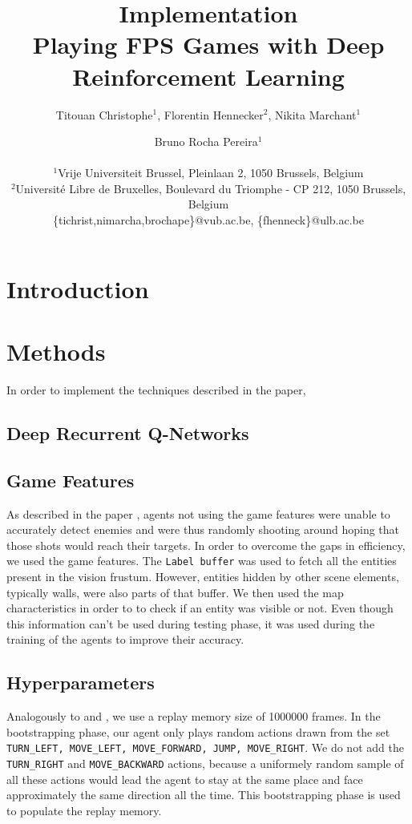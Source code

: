 \documentclass[letterpaper]{article}
\title{Implementation\\Playing FPS Games with Deep Reinforcement Learning}
\author{Titouan Christophe$^{1}$, Florentin Hennecker$^{2}$, Nikita Marchant$^{1}$ \and Bruno Rocha Pereira$^{1}$ \\
\mbox{}\\
$^1$Vrije Universiteit Brussel, Pleinlaan 2, 1050 Brussels, Belgium \\
$^2$Universit\'e Libre de Bruxelles, Boulevard du Triomphe - CP 212, 1050
Brussels, Belgium \\
\{tichrist,nimarcha,brochape\}@vub.ac.be, \{fhenneck\}@ulb.ac.be}
\begin{document}
\maketitle
\begin{abstract}
\end{abstract}

\section{Introduction}

\section{Methods}
In order to implement the techniques described in the paper,\todo{}

\subsection{Deep Recurrent Q-Networks}

\subsection{Game Features}
As described in the paper \citep{Lample2016}, agents not using the game features were unable to accurately detect enemies and were thus randomly shooting around hoping that those shots would reach their targets. In order to overcome the gaps in efficiency, we used the game features. The \texttt{Label buffer} was used to fetch all the entities present in the vision frustum. However, entities hidden by other scene elements, typically walls, were also parts of that buffer. We then used the map characteristics in order to to check if an entity was visible or not. Even though this information can't be used during testing phase, it was used during the training of the agents to improve their accuracy.


\subsection{Hyperparameters}
Analogously to \cite{Mnih2015} and \cite{Lample2016}, we use a replay memory size of 1000000 frames. In the bootstrapping phase, our agent only plays random actions drawn from the set \texttt{TURN\_LEFT, MOVE\_LEFT, MOVE\_FORWARD, JUMP, MOVE\_RIGHT}. We do not add the \texttt{TURN\_RIGHT} and \texttt{MOVE\_BACKWARD} actions, because a uniformely random sample of all these actions would lead the agent to stay at the same place and face approximately the same direction all the time. This bootstrapping phase is used to populate the replay memory.
\end{document}
